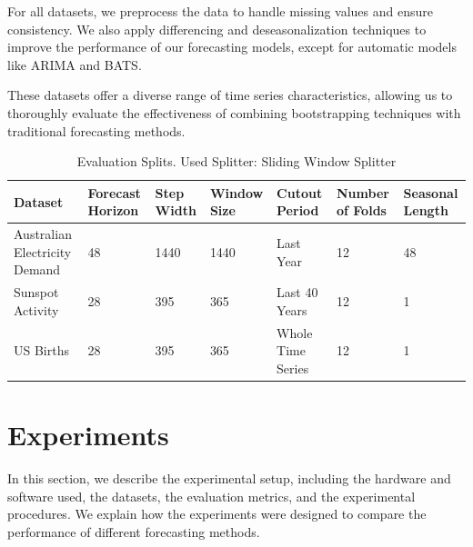 For all datasets, we preprocess the data to handle missing values and ensure consistency. We also apply differencing and deseasonalization techniques to improve the performance of our forecasting models, except for automatic models like ARIMA and BATS.

These datasets offer a diverse range of time series characteristics, allowing us to thoroughly evaluate the effectiveness of combining bootstrapping techniques with traditional forecasting methods.

\begin{table}[h]
    \centering
    \footnotesize

    \caption{Evaluation Splits. Used Splitter: Sliding Window Splitter}
    \label{tab:evaluation_splits}
    \begin{tabularx}{\textwidth}{X|X|X|X|X|X|X}
         \toprule
        Dataset & Forecast Horizon & Step Width & Window Size & Cutout Period & Number of Folds & Seasonal Length \\ \midrule
        Australian Electricity Demand & 48 & 1440 & 1440 & Last Year & 12 & 48 \\ 
        Sunspot Activity & 28 & 395 & 365 & Last 40 Years & 12 & 1\\
        US Births & 28 & 395 & 365 & Whole Time Series & 12 & 1 \\
        \bottomrule
    \end{tabularx}
\end{table}

\section{Experiments} \label{experiments}
In this section, we describe the experimental setup, including the hardware and software used, the datasets, the evaluation metrics, and the experimental procedures. We explain how the experiments were designed to compare the performance of different forecasting methods.





